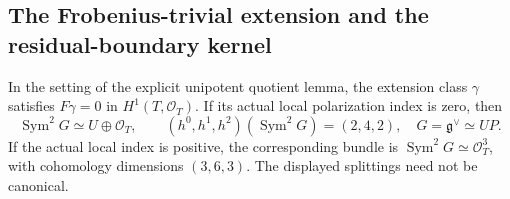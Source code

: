 \subsection{The Frobenius-trivial extension and the residual-boundary kernel}

\begin{lemma}
\label{lem:DE-A3-unipotent-Frobenius}
In the setting of the explicit unipotent quotient lemma, the extension
class $\gamma$ satisfies $F\gamma=0$ in $H^1(T,\mathcal O_T)$.
If its actual local polarization index is zero, then
\[
 \operatorname{Sym}^2G\simeq U\oplus\mathcal O_T,
 \qquad(h^0,h^1,h^2)(\operatorname{Sym}^2G)=(2,4,2),
 \quad G=\mathfrak g^\vee\simeq UP.
 \tag{DE-SK1}
\]
If the actual local index is positive, the corresponding bundle is
$\operatorname{Sym}^2G\simeq\mathcal O_T^3$, with cohomology dimensions
$(3,6,3)$. The displayed splittings need not be canonical.
\end{lemma}
